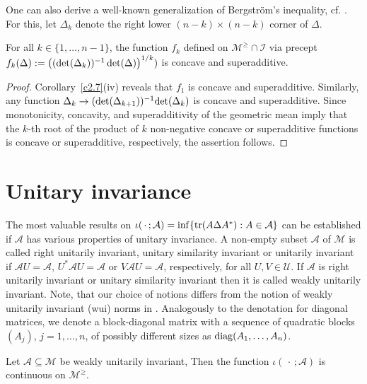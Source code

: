 \documentclass{amsart}
\begin{document}
One can also derive a well-known generalization of Bergstr\"om's inequality, cf. \cite[page~65]{Liu}. For this, let $\Delta_k$ denote the right lower $(n-k) \times (n-k)$ corner of $\Delta$.

\begin{cor} \label{c2.10}
      For all $k\in\{1,\ldots,n-1\}$, the function $f_k$ defined on ${\mathcal M}^{\geq} \cap {\mathcal I}$  via precept $f_k(\Delta):= \bigl(({\rm det}(\Delta_k))^{-1} \, {\rm det}(\Delta)\bigr)^{1/k})$ is  concave and superadditive.
\end{cor}

\begin{proof}
Corollary~\ref{c2.7}(iv) reveals that $f_1$ is concave and superadditive. Similarly, any function $\Delta_k \to ({\rm det}(\Delta_{k+1}))^{-1}  {\rm det}(\Delta_k)$ is concave and superadditive. Since monotonicity, concavity, and superadditivity of the geometric mean imply that the $k$-th root of the product of $k$ non-negative concave or superadditive functions is concave or superadditive, respectively, the assertion follows.
\end{proof}

\section{Unitary invariance}
\label{s3}

The most valuable results on $\iota(\,\cdot\,;{\mathcal A}) = \inf \{ {\rm tr}(A \Delta A^*) : A \in {\mathcal A} \}$ can be established if ${\mathcal A}$ has various properties of unitary invariance. A non-empty subset $\mathcal A$ of $\mathcal M$ is called right unitarily invariant, unitary similarity invariant or unitarily invariant if ${\mathcal A}U = {\mathcal A}$, $U^*{\mathcal A }U = {\mathcal A}$ or $V{\mathcal A}U={\mathcal A}$, respectively, for all $U,V \in {\mathcal U}$. If $\mathcal A$ is right unitarily invariant or unitary similarity invariant then it is called weakly unitarily invariant. Note, that our choice of notions differs from the notion of weakly unitarily invariant (wui) norms in  \cite[Section IV.4]{Bh}. Analogously to the denotation for diagonal matrices, we denote a block-diagonal matrix with a sequence of quadratic blocks $(A_j)$, $j=1,\ldots,n$, of possibly different sizes as ${\rm diag}(A_1, \ldots , A_n)$.

\begin{pro} \label{p3.1}
    Let ${\mathcal A} \subseteq \mathcal M$ be weakly unitarily invariant, Then the function $\iota(\,\cdot\,;{\mathcal A})$ is continuous on ${\mathcal M}^\geq$.
\end{pro}
\end{document}
